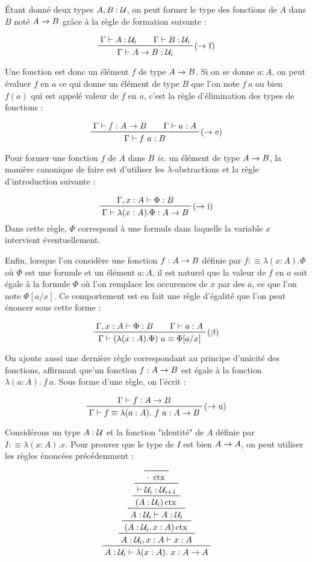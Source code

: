 \documentclass[../../rapport.tex]{subfiles}
\begin{document}
  Étant donné deux types $A, B : \mathcal U$, on peut former le type des fonctions de $A$ dans $B$ noté $A \rightarrow B$
  grâce à la règle de formation suivante :

  $$
  \prfinterspace=2em
  \prftree[r]{($\fun$ f)}{\Gamma \vdash A : \U_i}{\Gamma \vdash B : \U_i}{\Gamma \vdash A \fun B : \U_i}
  $$

  Une fonction est donc un élément $f$ de type $A \rightarrow B$.
  Si on se donne $a : A$, on peut évaluer $f$ en $a$ ce qui donne un élément de type $B$
  que l'on note $f\ a$ ou bien $f(a)$ qui est appelé valeur de $f$ en $a$, c'est la règle d'élimination des types de fonctions :

  $$
  \prfinterspace=2em
  \prftree[r]{($\fun$ e)}{\Gamma \vdash f : A \fun B}{\Gamma \vdash a : A}{\Gamma \vdash f\ a : B}
  $$

  Pour former une fonction $f$ de $A$ dans $B$ \textit{ie.} un élément de type $A \rightarrow B$,
  la manière canonique de faire est d'utiliser les $\lambda$-abstractions et la règle d'introduction suivante :

  $$
  \prftree[r]{($\fun$ i)}{\Gamma, x : A \vdash \Phi : B}{\Gamma \vdash \lambda (x : A). \Phi : A \fun B}
  $$
  Dans cette règle, $\Phi$ correspond à une formule dans laquelle la variable $x$ intervient éventuellement.

  Enfin, lorsque l'on considère une fonction $f : A \rightarrow B$ définie par $f :\equiv \lambda (x : A). \Phi$
  où $\Phi$ est une formule et un élément $a : A$, il est naturel que la valeur de $f$ en $a$ soit égale à
  la formule $\Phi$ où l'on remplace les occurences de $x$ par des $a$, ce que l'on note $\Phi[a/x]$.
  Ce comportement est en fait une règle d'égalité que l'on peut énoncer sous cette forme :

  $$
  \prfinterspace=2em
  \prftree[r]{($\beta$)}{\Gamma, x : A \vdash \Phi : B}{\Gamma \vdash a : A}
    {\Gamma \vdash (\lambda(x : A).\Phi)\ a \equiv \Phi[a/x]}
  $$

  On ajoute aussi une dernière règle correspondant au principe d'unicité des fonctions,
  affirmant que'un fonction $f : A \rightarrow B$ est égale à la fonction $\lambda (a: A).\ f\ a$.
  Sous forme d'une règle, on l'écrit :

  $$
  \prfinterspace=2em
  \prftree[r]{($\fun$ u)}
    {\Gamma \vdash f : A \fun B}
  {\Gamma \vdash f \equiv \lambda(a: A).\ f\ a : A \fun B}
  $$

  \begin{example}
    Considérons un type $A : \mathcal U$ et la fonction "identité" de $A$ définie par $I :\equiv \lambda(x : A).x$.
    Pour prouver que le type de $I$ est bien $A \rightarrow A$, on peut utiliser les règles énoncées précédemment :

    $$
    \prftree
      {\prftree
	{\prftree
	  {\prftree
	    {\prftree
	      {\prftree
		{\prfaxiom{\cdot\ \ctx}}
	      {\vdash \U_i : \U_{i+1}}}
	    {(A : \U_i) \ctx}}
	  {A : \U_i \vdash A : \U_i}}
	{(A : \U_i, x : A) \ctx}}
      {A : \U_i, x : A \vdash x : A}}
    {A : \U_i \vdash \lambda(x:A).\ x : A \fun A}
    $$
  \end{example}
\end{document}

